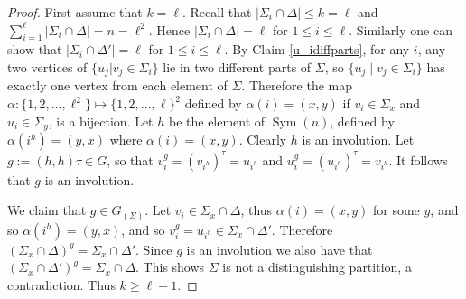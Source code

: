 \documentclass[11pt]{amsart}
\DeclareMathOperator{\Sym}{Sym}
\DeclareMathOperator{\Diag}{Diag}
\begin{document}
\begin{proof}
\medskip
First assume that \(k=\ell\).
Recall that \(|\Sigma_{i}\cap\Delta|\leqslant k=\ell\)
and \(\sum_{i=1}^{\ell}|\Sigma_{i}\cap\Delta|=n=\ell^{2}\).
Hence \(|\Sigma_{i}\cap \Delta|=\ell\) for \(1\leqslant i\leq\ell\). 
Similarly one can show that \(|\Sigma_{i}\cap\Delta'|=\ell\) for \(1\leqslant i\leqslant \ell\).
By Claim \ref{u_idiffparts}, for any \(i\), any two vertices of \(\{u_j|v_j\in \Sigma_i\}\) lie in two different parts of \(\Sigma\), so \(\{u_j \mid v_j\in \Sigma_i\}\) has exactly one vertex from each element of \(\Sigma\).
%
%
Therefore the map $\alpha:\{1,2,\ldots,\ell^2\}\mapsto \{1,2,\ldots,\ell\}^2$ defined by $\alpha(i)=(x,y)$ if $v_i\in \Sigma_x$ and $u_i\in \Sigma_y$, is a bijection.
Let $h$ be the element of $\Sym(n)$, defined by $\alpha(i^h)=(y,x)$ where $\alpha(i)=(x,y)$. Clearly $h$ is an involution.
 Let \(g:=(h,h)\tau\in G\), so that  $v_i^g=(v_{i^h})^\tau=u_{i^h}$ and $u_i^g=(u_{i^h})^\tau=v_{i^h}$. It follows that $g$ is an involution.
 
 
 We claim that $g\in G_{({\Sigma})}.$
Let $v_i\in\Sigma_x\cap \Delta$, thus $\alpha(i)=(x,y)$ for some $y$, and so $\alpha(i^h)=(y,x)$, and so $v_i^g=u_{i^h}\in \Sigma_x\cap\Delta'$.
Therefore \((\Sigma_{x}\cap\Delta)^{g}=\Sigma_{x}\cap\Delta'\).
Since \(g \) is an involution we also have that \((\Sigma_{x}\cap\Delta')^{g}=\Sigma_{x}\cap\Delta\).
This shows $\Sigma$ is not a distinguishing partition, a contradiction.  Thus
\(k\geqslant \ell+1\).








\end{proof}
\end{document}
